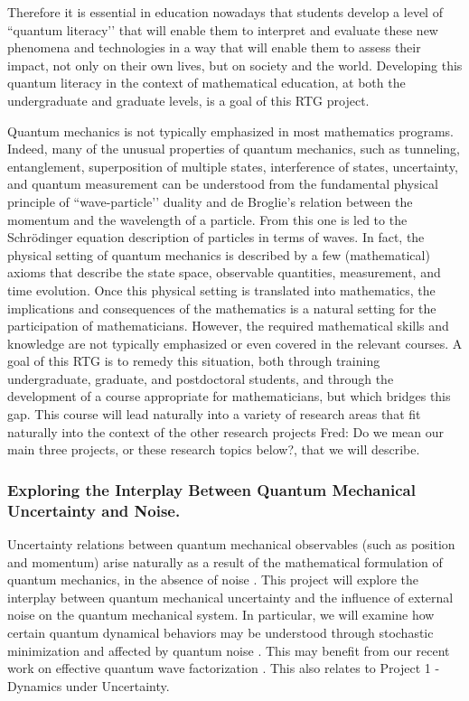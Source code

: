 \documentclass[11pt]{NSFamsart}
\newcommand{\FredNote}[1]{{\color{blue} Fred: #1}}
\begin{document}
Therefore it is essential in education nowadays that students develop a level of ``quantum literacy’’ \cite{foti2021quantum} that will enable them to interpret and evaluate these new phenomena and technologies in a way that will enable them to assess their impact, not only on their own  lives, but on society and the world. Developing this quantum literacy in the context of mathematical education,    at both the undergraduate and graduate   levels,  is a goal of this RTG project.


Quantum mechanics is not typically emphasized in most mathematics programs.  Indeed, many of the unusual properties of quantum mechanics, such as tunneling, entanglement, superposition of multiple states, interference of states, uncertainty, and quantum measurement can be understood from the fundamental physical principle of ``wave-particle’’ duality and de Broglie’s relation between the momentum and the wavelength of a particle.  From this one is led to the Schr\"{o}dinger equation description of particles in terms of waves. In fact, the physical setting of quantum mechanics is described by a few (mathematical) axioms that describe the state space, observable quantities, measurement, and time evolution.  Once this physical setting is translated into mathematics, the implications and consequences of the mathematics is a natural setting for the participation of mathematicians. However, the required mathematical skills and knowledge are not typically emphasized or even covered in the relevant courses. A goal of this RTG is to remedy this situation, both through training undergraduate, graduate, and postdoctoral students, and through the development of a course appropriate for mathematicians, but which bridges this gap. This course will lead naturally into a variety of research areas that fit naturally into the context of the other research projects \FredNote{Do we mean our main three projects, or these research topics below?}, that we will describe.

\subsubsection*{Exploring the Interplay Between Quantum Mechanical Uncertainty and Noise.} Uncertainty relations between quantum mechanical observables (such as position and momentum) arise naturally as a result of the mathematical formulation of quantum mechanics, in the absence of noise \cite{Griffiths2018IntroductionTQ}. This project will explore the interplay between quantum mechanical uncertainty and the influence of external noise \cite{Lindgren2019QuantumMC, Nagasawa2000StochasticPI} on the quantum mechanical system. In particular, we will examine how certain quantum dynamical behaviors  may be understood through stochastic minimization \cite{Lindgren2019QuantumMC} and affected by quantum noise \cite{Nurdin2019QuantumSP}. This may   benefit from our recent work on effective quantum wave factorization \cite{ZHANG2020132573}. This also relates to   Project 1 - Dynamics under Uncertainty.
\end{document}
